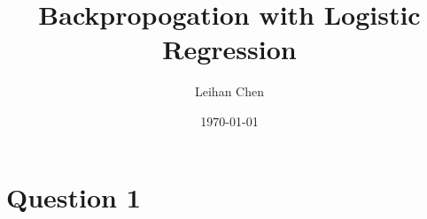 \documentclass[12pt,a4paper]{article}
\title{Backpropogation with Logistic Regression}
\author{Leihan Chen}
\date{\today}
\begin{document}
\maketitle
\section{Question 1}
\end{document}
